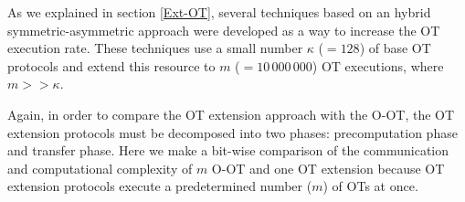 

As we explained in section \ref{Ext-OT}, several techniques based on an hybrid symmetric-asymmetric approach were developed as a way to increase the OT execution rate. These techniques use a small number $\kappa$ ($=128$) of base OT protocols and extend this resource to $m$ ($=10\,000\,000$) OT executions, where $ m >> \kappa$. 

Again, in order to compare the OT extension approach with the O-OT, the OT extension protocols must be decomposed into two phases: precomputation phase and transfer phase. Here we make a bit-wise comparison of the communication and computational complexity of $m$ O-OT and one OT extension because OT extension protocols execute a predetermined number ($m$) of OTs at once.

